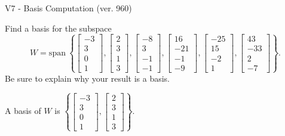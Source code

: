 \begin{exercise}
  \begin{exerciseTitle}V7 - Basis Computation (ver. 960)\end{exerciseTitle}
  \begin{exerciseStatement}
    Find a basis for the subspace 
\[W=\mathrm{span}\ \left\{\left[\begin{array}{r}
-3 \\
3 \\
0 \\
1
\end{array}\right] , \left[\begin{array}{r}
2 \\
3 \\
1 \\
3
\end{array}\right] , \left[\begin{array}{r}
-8 \\
3 \\
-1 \\
-1
\end{array}\right] , \left[\begin{array}{r}
16 \\
-21 \\
-1 \\
-9
\end{array}\right] , \left[\begin{array}{r}
-25 \\
15 \\
-2 \\
1
\end{array}\right] , \left[\begin{array}{r}
43 \\
-33 \\
2 \\
-7
\end{array}\right]\right\}.\]
 Be sure to explain why your result is a basis.


  \end{exerciseStatement}
  \begin{exerciseAnswer}
   A basis of \(W\) is  \(\left\{\left[\begin{array}{r}
-3 \\
3 \\
0 \\
1
\end{array}\right] , \left[\begin{array}{r}
2 \\
3 \\
1 \\
3
\end{array}\right]\right\}\).
  


  \end{exerciseAnswer}
\end{exercise}